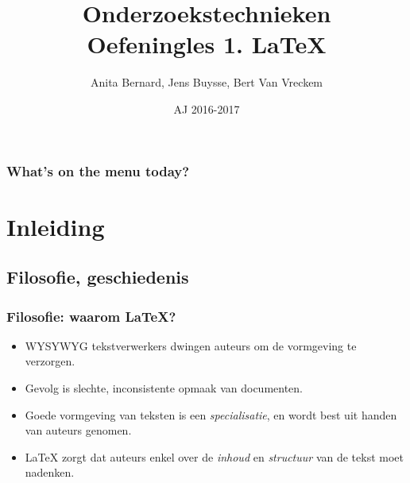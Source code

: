 \documentclass{beamer}
\title[Intro]{Onderzoekstechnieken\\Oefeningles 1. \LaTeX{}}
\author{Anita Bernard, Jens Buysse, Bert {Van Vreckem}}
\date{AJ 2016-2017}
\begin{document}

\HoGentLogo

\titleframe


\begin{frame}
  \frametitle{What's on the menu today?}

  \tableofcontents
\end{frame}

\section{Inleiding}

\subsection{Filosofie, geschiedenis}

\begin{frame}
  \frametitle{Filosofie: waarom {\LaTeX}?}
  
  \begin{itemize}
  \item<+-> WYSYWYG tekstverwerkers dwingen auteurs om de vormgeving te verzorgen.
  \item<+-> Gevolg is slechte, inconsistente opmaak van documenten.
  \item<+-> Goede vormgeving van teksten is een \emph{specialisatie}, en wordt best
    uit handen van auteurs genomen.
  \item<+-> {\LaTeX} zorgt dat auteurs enkel over de \emph{inhoud} en \emph{structuur} van de tekst moet nadenken.
  \end{itemize}
\end{frame}
\end{document}
